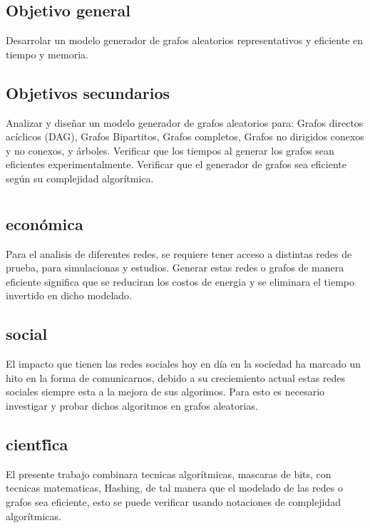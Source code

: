 \documentclass[11pt]{extarticle}
\begin{document}
  \subsection{Objetivo general}
  Desarrolar un modelo generador de grafos aleatorios representativos y eficiente en tiempo y memoria.
  \subsection{Objetivos secundarios}
      \begin{itemize}
        \guion Analizar y diseñar un modelo generador de grafos aleatorios para: Grafos directos acíclicos (DAG), Grafos Bipartitos, Grafos completos, Grafos no dirigidos conexos y no conexos, y árboles.
        \guion Verificar que los tiempos al generar los grafos sean eficientes experimentalmente.
        \guion Verificar que el generador de grafos sea eficiente según su complejidad algorítmica.
      \end{itemize}
\section{\justificacion}
  \subsection{\justificacion econ\'omica}
    Para el analisis de diferentes redes, se requiere tener acceso a distintas redes de prueba, para simulacionas y estudios.
    Generar  estas redes o grafos de manera eficiente significa que se reduciran los costos de energia y se
    eliminara el tiempo invertido en dicho modelado.
  \subsection{\justificacion social}
    El impacto que tienen las redes sociales hoy en d\'ia en la sociedad ha marcado un hito en la forma de comunicarnos,
    debido a su creciemiento actual estas redes sociales siempre esta a la mejora de sus algorimos.
    Para esto es necesario investigar y probar dichos algoritmos en grafos aleatorias.
  \subsection{\justificacion cient\'fica}
    El presente trabajo combinara tecnicas algor\'itmicas, mascaras de bits, con tecnicas
    matematicas, Hashing, de tal manera que el modelado de las redes o grafos sea eficiente,
    esto se puede verificar usando notaciones de complejidad algor\'itmicas.
\end{document}
